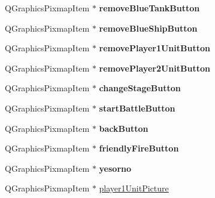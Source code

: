 \begin{DoxyCompactItemize}
\item 
Q\+Graphics\+Pixmap\+Item $\ast$ {\bfseries remove\+Blue\+Tank\+Button}\hypertarget{class_game_menu_ac2e4f8f3a0a760347ce8aae8a3471c48}{}\label{class_game_menu_ac2e4f8f3a0a760347ce8aae8a3471c48}

\item 
Q\+Graphics\+Pixmap\+Item $\ast$ {\bfseries remove\+Blue\+Ship\+Button}\hypertarget{class_game_menu_a5291121c9137f0f5395dc907e0fab7d0}{}\label{class_game_menu_a5291121c9137f0f5395dc907e0fab7d0}

\item 
Q\+Graphics\+Pixmap\+Item $\ast$ {\bfseries remove\+Player1\+Unit\+Button}\hypertarget{class_game_menu_addbd2f8181f964d60fda59124bab548d}{}\label{class_game_menu_addbd2f8181f964d60fda59124bab548d}

\item 
Q\+Graphics\+Pixmap\+Item $\ast$ {\bfseries remove\+Player2\+Unit\+Button}\hypertarget{class_game_menu_ae4e2074109a89d582cb9e88e83f37a36}{}\label{class_game_menu_ae4e2074109a89d582cb9e88e83f37a36}

\item 
Q\+Graphics\+Pixmap\+Item $\ast$ {\bfseries change\+Stage\+Button}\hypertarget{class_game_menu_a7305ba1cbd36a0c0383968581977b66e}{}\label{class_game_menu_a7305ba1cbd36a0c0383968581977b66e}

\item 
Q\+Graphics\+Pixmap\+Item $\ast$ {\bfseries start\+Battle\+Button}\hypertarget{class_game_menu_a63e87ded92f5c386c776fdf0db70c391}{}\label{class_game_menu_a63e87ded92f5c386c776fdf0db70c391}

\item 
Q\+Graphics\+Pixmap\+Item $\ast$ {\bfseries back\+Button}\hypertarget{class_game_menu_a5095d622706253beec6b63056c09e872}{}\label{class_game_menu_a5095d622706253beec6b63056c09e872}

\item 
Q\+Graphics\+Pixmap\+Item $\ast$ {\bfseries friendly\+Fire\+Button}\hypertarget{class_game_menu_acbf50def7da8afa135d24e6a0f8a8a92}{}\label{class_game_menu_acbf50def7da8afa135d24e6a0f8a8a92}

\item 
Q\+Graphics\+Pixmap\+Item $\ast$ {\bfseries yesorno}\hypertarget{class_game_menu_ad650020a1b9c6076803203746289cca3}{}\label{class_game_menu_ad650020a1b9c6076803203746289cca3}

\item 
Q\+Graphics\+Pixmap\+Item $\ast$ \hyperlink{class_game_menu_a7b6ec049efa3d2edb073b0c6f8d4410c}{player1\+Unit\+Picture}\hypertarget{class_game_menu_a7b6ec049efa3d2edb073b0c6f8d4410c}{}\label{class_game_menu_a7b6ec049efa3d2edb073b0c6f8d4410c}


\end{DoxyCompactItemize}
